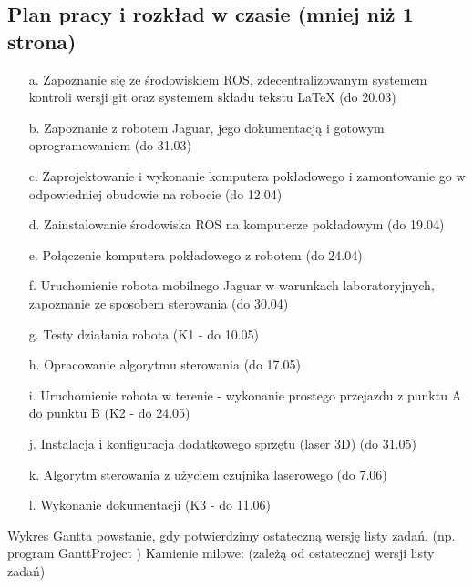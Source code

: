 \subsection{Plan pracy i rozkład w czasie (mniej niż 1 strona)}
\begin{enumerate}
\item[a.] Zapoznanie się ze środowiskiem ROS, zdecentralizowanym systemem kontroli wersji git oraz systemem składu tekstu LaTeX (do 20.03)
\item[b.] Zapoznanie z robotem Jaguar, jego dokumentacją i gotowym oprogramowaniem (do 31.03)
\item[c.] Zaprojektowanie i wykonanie komputera pokładowego i zamontowanie go w odpowiedniej obudowie na robocie (do 12.04)
\item[d.] Zainstalowanie środowiska ROS na komputerze pokładowym (do 19.04)
\item[e.] Połączenie komputera pokładowego z robotem (do 24.04)
\item[f.] Uruchomienie robota mobilnego Jaguar w warunkach laboratoryjnych, zapoznanie ze sposobem sterowania (do 30.04)
\item[g.] Testy działania robota (K1 - do 10.05)
\item[h.] Opracowanie algorytmu sterowania (do 17.05)
\item[i.] Uruchomienie robota w terenie - wykonanie prostego przejazdu z punktu A do punktu B (K2 - do 24.05)
\item[j.] Instalacja i konfiguracja dodatkowego sprzętu (laser 3D) (do 31.05)
\item[k.] Algorytm sterowania z użyciem czujnika laserowego (do 7.06)
\item[l.] Wykonanie dokumentacji (K3 - do 11.06)
\end{enumerate}

Wykres Gantta powstanie, gdy potwierdzimy ostateczną wersję listy zadań. (np. program GanttProject )
Kamienie milowe: (zależą od ostatecznej wersji listy zadań)
		
	
	

													
